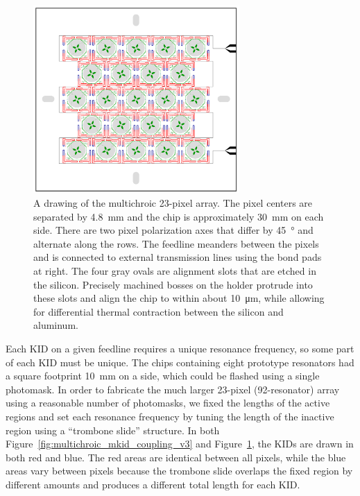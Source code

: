 \begin{figure}[htb]
\centering
\includegraphics[width=0.7\textwidth]{multichroic/multichroic_23-pixel_layout.pdf}
\caption[A drawing of the multichroic 23-pixel array.]
{
A drawing of the multichroic 23-pixel array.
The pixel centers are separated by \SI{4.8}{mm} and the chip is approximately \SI{30}{mm} on each side.
There are two pixel polarization axes that differ by \SI{45}{\degree} and alternate along the rows.
The feedline meanders between the pixels and is connected to external transmission lines using the bond pads at right.
The four gray ovals are alignment slots that are etched in the silicon.
Precisely machined bosses on the holder protrude into these slots and align the chip to within about \SI{10}{\micro\meter}, while allowing for differential thermal contraction between the silicon and aluminum.
}
\label{fig:multichroic_23-pixel_layout}
\end{figure}

Each KID on a given feedline requires a unique resonance frequency, so some part of each KID must be unique.
The chips containing eight prototype resonators had a square footprint \SI{10}{mm} on a side, which could be flashed using a single photomask.
In order to fabricate the much larger 23-pixel (92-resonator) array using a reasonable number of photomasks, we fixed the lengths of the active regions and set each resonance frequency by tuning the length of the inactive region using a ``trombone slide'' structure.
In both Figure~\ref{fig:multichroic_mkid_coupling_v3} and Figure~\ref{fig:multichroic_23-pixel_layout}, the KIDs are drawn in both red and blue.
The red areas are identical between all pixels, while the blue areas vary between pixels because the trombone slide overlaps the fixed region by different amounts and produces a different total length for each KID.

